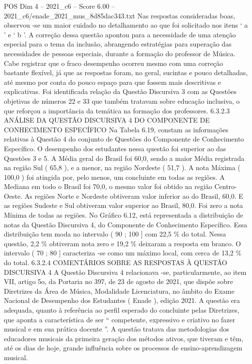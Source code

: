 \begin{textsample}{POS Dim 4 – 2021\_c6 – Score 6.00 – 2021\_c6/enade\_2021\_mus\_8d85dac343.txt}
Nas respostas consideradas boas, observou -se um maior cuidado no detalhamento ao que foi solicitado nos itens ‘ a ’ e ‘ b ’.
A correção dessa questão apontou para a necessidade de uma atenção especial para o tema da inclusão, abrangendo estratégias para superação das necessidades de pessoas especiais, durante a formação do professor de Música.
Cabe registrar que o fraco desempenho ocorreu mesmo com uma correção bastante flexível, já que as respostas foram, no geral, sucintas e pouco detalhadas, até mesmo por conta do pouco espaço para que fossem mais descritivas e explicativas.
Foi identificada relação da Questão Discursiva 3 com as Questões objetivas de números 22 e 33 que também tratavam sobre educação inclusiva, o que reforçou a importância da temática na formação dos professores. 6.3.2.3 ANÁLISE DA QUESTÃO DISCURSIVA 4 DO COMPONENTE DE CONHECIMENTO ESPECÍFICO Na Tabela 6.19, constam as informações relativas à Questão 4 do conjunto de Questões do Componente de Conhecimento Específico.
O desempenho dos estudantes nessa questão foi superior ao das Questões 3 e 5.
A Média geral do Brasil foi 60,0, sendo a maior Média registrada na região Sul ( 65,8 ), e a menor, na região Nordeste ( 51,7 ).
A nota Máxima ( 100,0 ) foi atingida por, pelo menos, um concluinte em todas as regiões.
A Mediana em todo o Brasil foi 70,0, o mesmo valor foi obtido na região Centro-Oeste.
As regiões Norte e Nordeste obtiveram valor inferior ao do Brasil, 60,0.
E as regiões Sudeste e Sul obtiveram valor superior ao Brasil, 80,0.
Foi zero a nota Mínima de todas as regiões.
No Gráfico 6.12, está representada a distribuição de notas da Questão Discursiva 4, do Componente de Conhecimento Específico.
Essa distribuição tem moda no intervalo ( 90 ; 100 ] com 22,5 \% do total.
Nessa questão, 2,2 \% obtiveram nota zero e 19,2 \% deixaram a resposta em branco.
O intervalo ( 70 ; 80 ] caracteriza -se como um máximo local, com cerca de 13,2 \% do total. 6.3.2.4 COMENTÁRIOS SOBRE AS RESPOSTAS À QUESTÃO DISCURSIVA 4 A Questão Discursiva 4 relacionava -se, particularmente, ao item VII, artigo 5o, da Portaria no 397, de 23 de agosto de 2021, que dispõe sobre Diretrizes da Área de Música, Modalidade Licenciatura, no âmbito do Exame Nacional de Desempenho dos Estudantes ( Enade ), edição 2021.
A questão era adequada, quanto à referência ao perfil esperado do concluinte pelas Diretrizes, que aponta a característica de ser “ competente, expressivo e criativo no fazer musical e em sua prática docente ”.
A questão tratava das metodologias dos educadores musicais da primeira geração dos métodos ativos, que tiveram e têm, até os dias de hoje, grande influência sobre os processos de ensino-aprendizagem musical.

\end{textsample}
